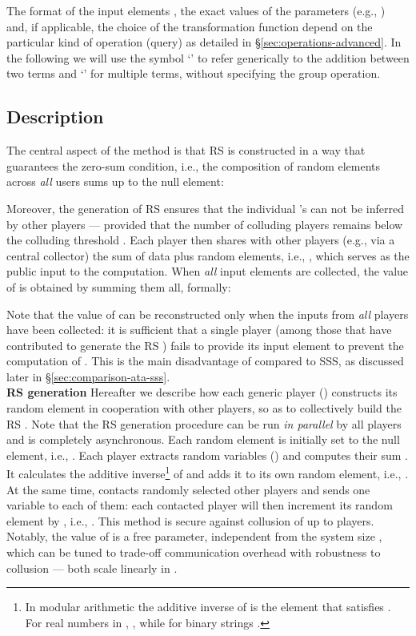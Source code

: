 \documentclass{sig-alternate}
\begin{document}
The format of the input elements , the exact values of the parameters (e.g., ) and, if applicable, the choice of the transformation function  depend on the particular kind of operation (query) as detailed in \S\ref{sec:operations-advanced}. 
 In the following we will use the symbol  `' to refer generically to the addition between two terms and  `' for multiple terms, without specifying the group operation. 


\subsection{Description}\label{sec:ata}


The central aspect of the \ata method is that RS is constructed in a way that guarantees the zero-sum condition, i.e., the composition of random elements across {\em all} users sums up to the null element: 

Moreover, the generation of RS ensures that the individual 's can not be inferred by other players --- provided that the number of colluding players remains below the colluding threshold . 
Each player  then shares with other players (e.g., via a central collector) the sum of data plus random elements, i.e., , which serves as the public input to the computation.
When {\em all} input elements  are collected, the value of  is obtained by summing them all, formally:

Note that the value of  can be reconstructed only when the inputs from {\em all} players have been collected: it is sufficient that a single player (among those that have contributed to generate the RS ) fails to provide its input element to prevent the computation of . This is the main disadvantage of \ata compared to SSS, as discussed later in \S \ref{sec:comparison-ata-sss}.\\

{\bf RS generation}
Hereafter we describe how each generic player  () constructs its random element  in cooperation with other players, so as to collectively build the RS  .
Note that the RS generation procedure can be run {\em in parallel} by all players and is completely asynchronous.
Each random element is initially set to the null element, i.e., . Each player  extracts  random variables  () and computes their sum .
It calculates  the additive inverse\footnote{In modular arithmetic  the additive inverse  of  is the element that satisfies . For real numbers in , , while for binary strings . }  of  and adds it to its own random element, i.e., .
At the same time,   contacts  randomly selected other players and  sends one variable  to each of them: 
each contacted player  will then increment its random element by  , i.e., .
This method is secure against collusion of up to  players.
Notably, the value of  is a free parameter,   independent from the system size , which can be tuned to trade-off communication overhead with robustness to collusion --- both scale linearly in .\\
\end{document}
